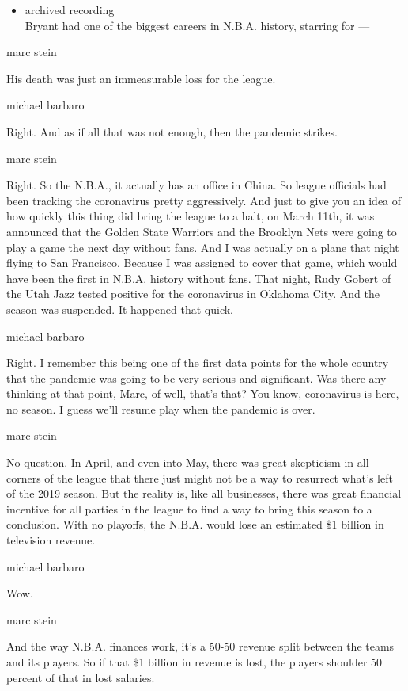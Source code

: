 \begin{itemize}
\tightlist
\item
  archived recording\\
  Bryant had one of the biggest careers in N.B.A. history, starring for
  ---
\end{itemize}

marc stein

His death was just an immeasurable loss for the league.

michael barbaro

Right. And as if all that was not enough, then the pandemic strikes.

marc stein

Right. So the N.B.A., it actually has an office in China. So league
officials had been tracking the coronavirus pretty aggressively. And
just to give you an idea of how quickly this thing did bring the league
to a halt, on March 11th, it was announced that the Golden State
Warriors and the Brooklyn Nets were going to play a game the next day
without fans. And I was actually on a plane that night flying to San
Francisco. Because I was assigned to cover that game, which would have
been the first in N.B.A. history without fans. That night, Rudy Gobert
of the Utah Jazz tested positive for the coronavirus in Oklahoma City.
And the season was suspended. It happened that quick.

michael barbaro

Right. I remember this being one of the first data points for the whole
country that the pandemic was going to be very serious and significant.
Was there any thinking at that point, Marc, of well, that's that? You
know, coronavirus is here, no season. I guess we'll resume play when the
pandemic is over.

marc stein

No question. In April, and even into May, there was great skepticism in
all corners of the league that there just might not be a way to
resurrect what's left of the 2019 season. But the reality is, like all
businesses, there was great financial incentive for all parties in the
league to find a way to bring this season to a conclusion. With no
playoffs, the N.B.A. would lose an estimated \$1 billion in television
revenue.

michael barbaro

Wow.

marc stein

And the way N.B.A. finances work, it's a 50-50 revenue split between the
teams and its players. So if that \$1 billion in revenue is lost, the
players shoulder 50 percent of that in lost salaries.

